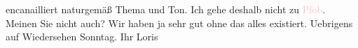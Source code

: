                encanailliert naturgemäß Thema und Ton. Ich gehe deshalb nicht zu {\pb}\textcolor{pink}{Pfob}{}\ledrightnote{\textcolor{pink}{Café Pfob}}. Meinen Sie nicht auch? Wir haben ja sehr gut
               ohne das alles existiert. Uebrigens auf Wiedersehen Sonntag.\pend
           \pstart Ihr \spacefill\mbox{Loris}\pend{}\endnumbering{}  
      